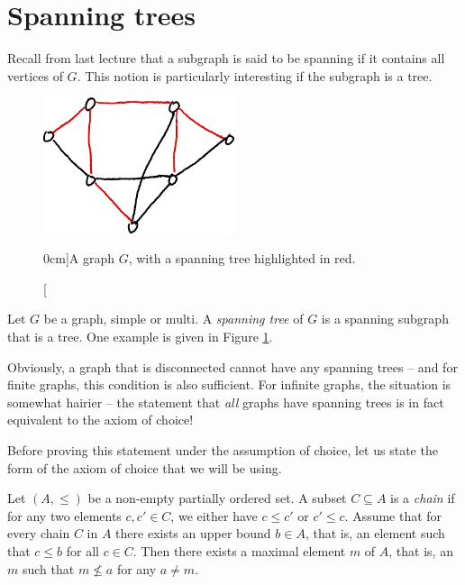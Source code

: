 \documentclass[nobib]{tufte-handout}
\begin{document}
\section{Spanning trees}

Recall from last lecture that a subgraph is said to be spanning if it contains all vertices of $G$. This notion is particularly interesting if the subgraph is a tree.

\begin{figure}
  \centering
  \includegraphics[width=0.5\textwidth]{graphics/L3_trees/spanning_tree.png}
  \caption[][0cm]{A graph $G$, with a spanning tree highlighted in red.}
  \label{fig:spanning_tree}
\end{figure}

\begin{definition}
  Let $G$ be a graph, simple or multi. A \emph{spanning tree} of $G$ is a spanning subgraph that is a tree. One example is given in Figure \ref{fig:spanning_tree}.
\end{definition}

Obviously, a graph that is disconnected cannot have any spanning trees -- and for finite graphs, this condition is also sufficient. For infinite graphs, the situation is somewhat hairier -- the statement that \emph{all} graphs have spanning trees is in fact equivalent to the axiom of choice!

Before proving this statement under the assumption of choice, let us state the form of the axiom of choice that we will be using.

\begin{lemma}
  Let $(A, \leq)$ be a non-empty partially ordered set. A subset $C \subseteq A$ is a \emph{chain} if for any two elements $c, c' \in C$, we either have $c \leq c'$ or $c' \leq c$. Assume that for every chain $C$ in $A$ there exists an upper bound $b \in A$, that is, an element such that $c \leq b$ for all $c \in C$. Then there exists a maximal element $m$ of $A$, that is, an $m$ such that $m \not\leq a$ for any $a \neq m$.
\end{lemma}
\end{document}
